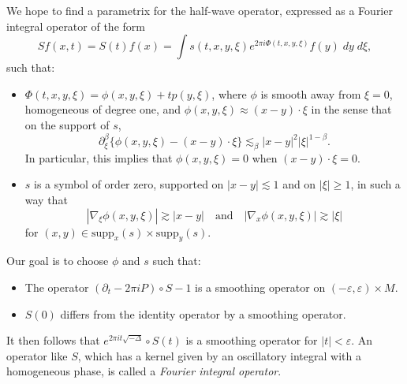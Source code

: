 

We hope to find a parametrix for the half-wave operator, expressed as a Fourier integral operator of the form
%
\[ Sf(x,t) = S(t)f(x) = \int s(t,x,y,\xi) e^{2 \pi i \Phi(t,x,y,\xi)} f(y)\; dy\; d\xi, \]
%
such that:
%
\begin{itemize}
    \item $\Phi(t,x,y,\xi) = \phi(x,y,\xi) + t p(y,\xi)$, where $\phi$ is smooth away from $\xi = 0$, homogeneous of degree one, and $\phi(x,y,\xi) \approx (x - y) \cdot \xi$ in the sense that on the support of $s$,
    \[ \partial^\beta_\xi \{ \phi(x,y,\xi) - (x - y) \cdot \xi \} \lesssim_\beta |x - y|^2 |\xi|^{1 - \beta}. \]
    In particular, this implies that $\phi(x,y,\xi) = 0$ when $(x - y) \cdot \xi = 0$.

    \item $s$ is a symbol of order zero, supported on $|x - y| \lesssim 1$ and on $|\xi| \geq 1$, in such a way that
    \[ |\nabla_\xi \phi(x,y,\xi)| \gtrsim |x - y| \quad\text{and}\quad |\nabla_x \phi(x,y,\xi)| \gtrsim |\xi| \]
    for $(x,y) \in \text{supp}_x(s) \times \text{supp}_y(s)$.
\end{itemize}
%
Our goal is to choose $\phi$ and $s$ such that:
%
\begin{itemize}
    \item The operator $(\partial_t - 2 \pi i P) \circ S - 1$ is a smoothing operator on $(-\varepsilon,\varepsilon) \times M$.

    \item $S(0)$ differs from the identity operator by a smoothing operator.
\end{itemize}
%
It then follows that $e^{2 \pi i t \sqrt{-\Delta}} \circ S(t)$ is a smoothing operator for $|t| < \varepsilon$. An operator like $S$, which has a kernel given by an oscillatory integral with a homogeneous phase, is called a \emph{Fourier integral operator}.

